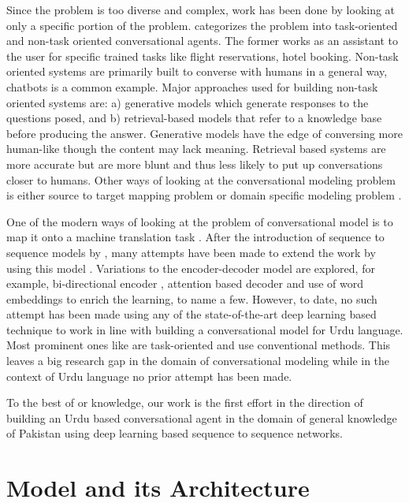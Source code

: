 \documentclass[conference]{IEEEtran}
\begin{document}
Since the problem is too diverse and complex, work has been done by looking at only a specific portion of the problem. \cite{chen2017survey} categorizes the problem into task-oriented and non-task oriented conversational agents. The former works as an assistant to the user for specific trained tasks like flight reservations, hotel booking. Non-task oriented systems are primarily built to converse with humans in a general way, chatbots is a common example. Major approaches used for building non-task oriented systems are: a) generative models which generate responses to the questions posed, and b) retrieval-based models that refer to a knowledge base before producing the answer. Generative models have the edge of conversing more human-like though the content may lack meaning. Retrieval based systems are more accurate but are more blunt and thus less likely to put up conversations closer to humans. Other ways of looking at the conversational modeling problem is either source to target mapping problem \cite{ritter2011data} or domain specific modeling problem \cite{banchs2012iris}. 
 
One of the modern ways of looking at the problem of conversational model is to map it onto a machine translation task \cite{ritter2011data}. After the introduction of sequence to sequence models by \cite{sutskever2014sequence}, many attempts have been made to extend the work by using this model \cite{Serban2016building, Sordoni2015, ritter2011data}. Variations to the encoder-decoder model are explored, for example, bi-directional encoder \cite{BahdanauCB14}, attention based decoder \cite{BahdanauCB14} and use of word embeddings \cite{mikolov2013distributed, pennington2014glove} to enrich the learning, to name a few. However, to date, no such attempt has been made using any of the state-of-the-art deep learning based technique to work in line with building a conversational model for Urdu language. Most prominent ones like \cite{kaleem2014development, arain2018artificial} are task-oriented and use conventional methods. This leaves a big research gap in the domain of conversational modeling while in the context of Urdu language no prior attempt has been made.

To the best of or knowledge, our work is the first effort in the direction of building an Urdu based conversational agent in the domain of general knowledge of Pakistan using deep learning based sequence to sequence networks.   

\section{Model and its Architecture}
\end{document}

